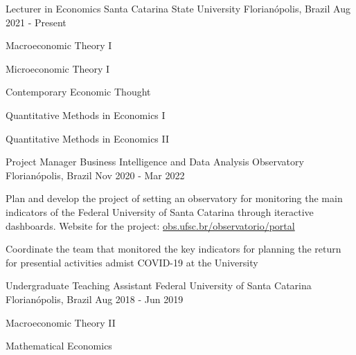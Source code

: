 

\begin{cventries}

  \cventry
    {Lecturer in Economics} %
    {Santa Catarina State University} %
    {Florianópolis, Brazil} %
    {Aug 2021 - Present} %
    {
     \begin{cvitems} %
        \item {Macroeconomic Theory I}
        \item {Microeconomic Theory I}
        \item {Contemporary Economic Thought}
        \item {Quantitative Methods in Economics I}
        \item {Quantitative Methods in Economics II}
      \end{cvitems}
    }

  \cventry
    {Project Manager} %
    {Business Intelligence and Data Analysis Observatory} %
    {Florianópolis, Brazil} %
    {Nov 2020 - Mar 2022} %
    {
      \begin{cvitems} %
        \item {Plan and develop the project of setting an observatory for monitoring the main indicators of the Federal University of Santa Catarina through iteractive dashboards. Website for the project: \href{https://obs.ufsc.br/observatorio/portal/}{obs.ufsc.br/observatorio/portal}}
        \item {Coordinate the team that monitored the key indicators for planning the return for presential activities admist COVID-19 at the University}
      \end{cvitems}
    }

\cventry
    {Undergraduate Teaching Assistant} %
    {Federal University of Santa Catarina} %
    {Florianópolis, Brazil} %
    {Aug 2018 - Jun 2019} %
    {
      \begin{cvitems} %
        \item {Macroeconomic Theory II}
        \item {Mathematical Economics}
      \end{cvitems}
    }


\end{cventries}
